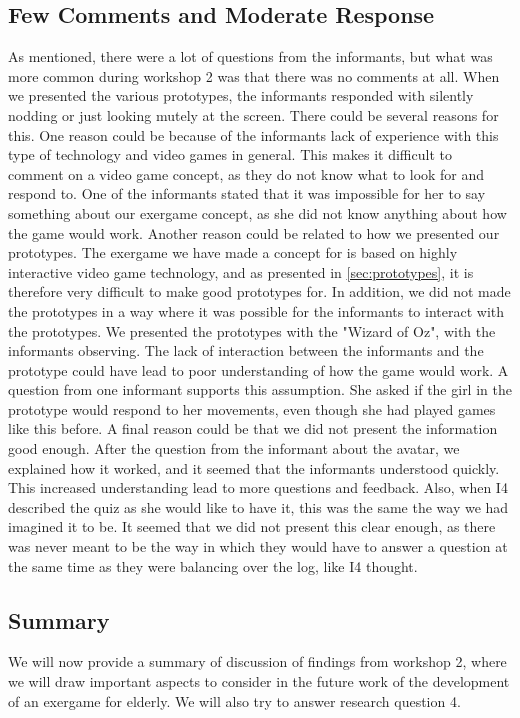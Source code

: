 \subsection{Few Comments and Moderate Response}
As mentioned, there were a lot of questions from the informants, but what was more common during workshop 2 was that there was no comments at all. When we presented the various prototypes, the informants responded with silently nodding or just looking mutely at the screen. There could be several reasons for this. One reason could be because of the informants lack of experience with this type of technology and video games in general. This makes it difficult to comment on a video game concept, as they do not know what to look for and respond to. One of the informants stated that it was impossible for her to say something about our exergame concept, as she did not know anything about how the game would work. Another reason could be related to how we presented our prototypes. The exergame we have made a concept for is based on highly interactive video game technology, and as presented in \ref{sec:prototypes}, it is therefore very difficult to make good prototypes for. In addition, we did not made the prototypes in a way where it was possible for the informants to interact with the prototypes. We presented the prototypes with the "Wizard of Oz", with the informants observing. The lack of interaction between the informants and the prototype could have lead to poor understanding of how the game would work. A question from one informant supports this assumption. She asked if the girl in the prototype would respond to her movements, even though she had played games like this before. A final reason could be that we did not present the information good enough. After the question from the informant about the avatar, we explained how it worked, and it seemed that the informants understood quickly. This increased understanding lead to more questions and feedback. Also, when I4 described the quiz as she would like to have it, this was the same the way we had imagined it to be. It seemed that we did not present this clear enough, as there was never meant to be the way in which they would have to answer a question at the same time as they were balancing over the log, like I4 thought.   

\subsection{Summary}
We will now provide a summary of discussion of findings from workshop 2, where we will draw important aspects to consider in the future work of the development of an exergame for elderly. We will also try to answer research question 4.

